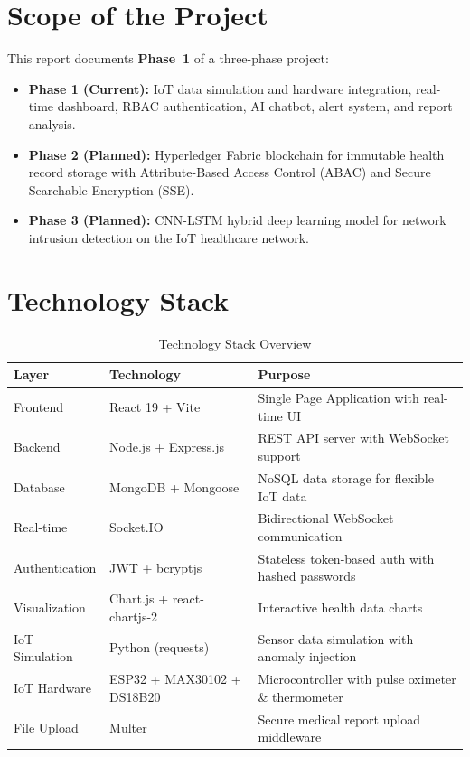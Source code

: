 \documentclass[12pt,a4paper]{report}
\begin{document}
\section{Scope of the Project}
This report documents \textbf{Phase~1} of a three-phase project:
\begin{itemize}[leftmargin=*]
    \item \textbf{Phase 1 (Current):} IoT data simulation and hardware integration, real-time dashboard, RBAC authentication, AI chatbot, alert system, and report analysis.
    \item \textbf{Phase 2 (Planned):} Hyperledger Fabric blockchain for immutable health record storage with Attribute-Based Access Control (ABAC) and Secure Searchable Encryption (SSE).
    \item \textbf{Phase 3 (Planned):} CNN-LSTM hybrid deep learning model for network intrusion detection on the IoT healthcare network.
\end{itemize}

\section{Technology Stack}
\begin{table}[H]
\centering
\caption{Technology Stack Overview}
\label{tab:techstack}
\begin{tabular}{|l|l|p{6cm}|}
\hline
\textbf{Layer} & \textbf{Technology} & \textbf{Purpose} \\
\hline
Frontend & React 19 + Vite & Single Page Application with real-time UI \\
\hline
Backend & Node.js + Express.js & REST API server with WebSocket support \\
\hline
Database & MongoDB + Mongoose & NoSQL data storage for flexible IoT data \\
\hline
Real-time & Socket.IO & Bidirectional WebSocket communication \\
\hline
Authentication & JWT + bcryptjs & Stateless token-based auth with hashed passwords \\
\hline
Visualization & Chart.js + react-chartjs-2 & Interactive health data charts \\
\hline
IoT Simulation & Python (requests) & Sensor data simulation with anomaly injection \\
\hline
IoT Hardware & ESP32 + MAX30102 + DS18B20 & Microcontroller with pulse oximeter \& thermometer \\
\hline
File Upload & Multer & Secure medical report upload middleware \\
\hline
\end{tabular}
\end{table}
\end{document}
